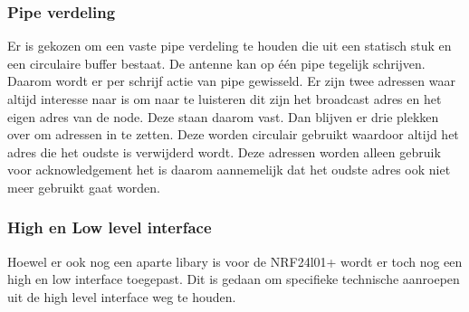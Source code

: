 \documentclass[a4paper, 11pt, oneside]{report}
\begin{document}
\subsubsection{Pipe verdeling}
Er is gekozen om een vaste pipe verdeling te houden die uit een statisch stuk en een circulaire buffer bestaat.
De antenne kan op één pipe tegelijk schrijven. 
Daarom wordt er per schrijf actie van pipe gewisseld.
Er zijn twee adressen waar altijd interesse naar is om naar te luisteren dit zijn het broadcast adres en het eigen adres van de node.
Deze staan daarom vast. 
Dan blijven er drie plekken over om adressen in te zetten. 
Deze worden circulair gebruikt waardoor altijd het adres die het oudste is verwijderd wordt.
Deze adressen worden alleen gebruik voor acknowledgement het is daarom aannemelijk dat het oudste adres ook niet meer gebruikt gaat worden.

\subsubsection{High en Low level interface}
Hoewel er ook nog een aparte libary is voor de NRF24l01+ wordt er toch nog een high en low interface toegepast. 
Dit is gedaan om specifieke technische aanroepen uit de high level interface weg te houden.




\clearpage
\appendix
\end{document}
